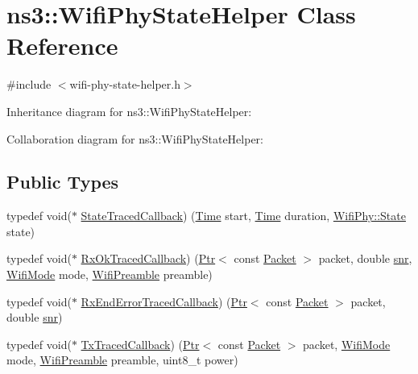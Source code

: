 \hypertarget{classns3_1_1WifiPhyStateHelper}{}\section{ns3\+:\+:Wifi\+Phy\+State\+Helper Class Reference}
\label{classns3_1_1WifiPhyStateHelper}


{\ttfamily \#include $<$wifi-\/phy-\/state-\/helper.\+h$>$}



Inheritance diagram for ns3\+:\+:Wifi\+Phy\+State\+Helper\+:


Collaboration diagram for ns3\+:\+:Wifi\+Phy\+State\+Helper\+:
\subsection*{Public Types}
\begin{DoxyCompactItemize}
\item 
typedef void($\ast$ \hyperlink{classns3_1_1WifiPhyStateHelper_a516f6877c073e275c9cbe21ab5ff7e24}{State\+Traced\+Callback}) (\hyperlink{classns3_1_1Time}{Time} start, \hyperlink{classns3_1_1Time}{Time} duration, \hyperlink{classns3_1_1WifiPhy_af97408fa76f99797497b492758467143}{Wifi\+Phy\+::\+State} state)
\item 
typedef void($\ast$ \hyperlink{classns3_1_1WifiPhyStateHelper_aa081a01199f8b878e613569e36483cfe}{Rx\+Ok\+Traced\+Callback}) (\hyperlink{classns3_1_1Ptr}{Ptr}$<$ const \hyperlink{classns3_1_1Packet}{Packet} $>$ packet, double \hyperlink{lte__pathloss_8m_ae6e82a215dff6b79fb6e9952a1b78453}{snr}, \hyperlink{classns3_1_1WifiMode}{Wifi\+Mode} mode, \hyperlink{group__wifi_ga5e94a56cb338a14ffbbb19c6a41251eb}{Wifi\+Preamble} preamble)
\item 
typedef void($\ast$ \hyperlink{classns3_1_1WifiPhyStateHelper_a9cac2aa608493ee6df2cd4d847b6f0ed}{Rx\+End\+Error\+Traced\+Callback}) (\hyperlink{classns3_1_1Ptr}{Ptr}$<$ const \hyperlink{classns3_1_1Packet}{Packet} $>$ packet, double \hyperlink{lte__pathloss_8m_ae6e82a215dff6b79fb6e9952a1b78453}{snr})
\item 
typedef void($\ast$ \hyperlink{classns3_1_1WifiPhyStateHelper_ac41c563c4e3bb16194b776a0b30391a6}{Tx\+Traced\+Callback}) (\hyperlink{classns3_1_1Ptr}{Ptr}$<$ const \hyperlink{classns3_1_1Packet}{Packet} $>$ packet, \hyperlink{classns3_1_1WifiMode}{Wifi\+Mode} mode, \hyperlink{group__wifi_ga5e94a56cb338a14ffbbb19c6a41251eb}{Wifi\+Preamble} preamble, uint8\+\_\+t power)
\end{DoxyCompactItemize}
